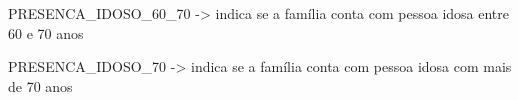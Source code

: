 \begin{compactitem}
    \begin{compactitem}[]
    \item PRESENCA_IDOSO_60_70 -> indica se a família conta com pessoa idosa entre 60 e 70 anos
    \item PRESENCA_IDOSO_70 -> indica se a família conta com pessoa idosa com mais de 70 anos
    \end{compactitem}

\end{compactitem}